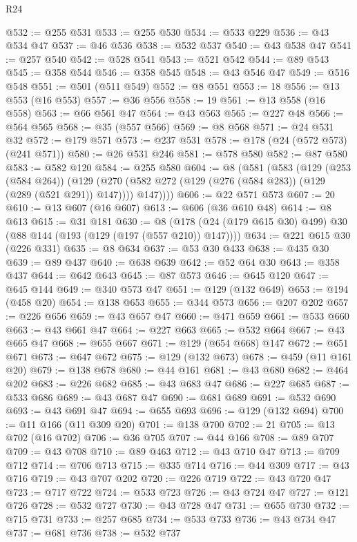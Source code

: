 \begin{lexlean}{R24}
\begin{coremodule}
{{{{{{{{{{{{{{{{{{{{{{{{{{{{{{{{{{{@532 := @255 @531
@533 := @255 @530
@534 := @533 @229
@536 := @43 @534 @47
@537 := @46 @536
@538 := @532 @537
@540 := @43 @538 @47
@541 := @257 @540
@542 := @528 @541
@543 := @521 @542
@544 := @89 @543
@545 := @358 @544
@546 := @358 @545
@548 := @43 @546 @47
@549 := @516 @548
@551 := @501 (@511 @549)
@552 := @8 @551
@553 := 18
@556 := @13 @553 (@16 @553)
@557 := @36 @556
@558 := 19
@561 := @13 @558 (@16 @558)
@563 := @66 @561 @47
@564 := @43 @563
@565 := @227 @48
@566 := @564 @565
@568 := @35 (@557 @566)
@569 := @8 @568
@571 := @24 @531 @32
@572 := @179 @571
@573 := @237 @531
@578 := @178 (@24 (@572 @573) (@241 @571))
@580 := @26 @531 @246
@581 := @578 @580
@582 := @87 @580
@583 := @582 @120
@584 := @255 @580
@604 := @8
    (@581
      (@583
        (@129
          (@253 (@584 @264))
          (@129 (@270 (@582 @272 (@129 (@276 (@584 @283)) (@129 (@289 (@521 @291)) @147)))) @147))))
@606 := @22 @571 @573
@607 := 20
@610 := @13 @607 (@16 @607)
@613 := @606 (@36 @610 @48)
@614 := @8 @613
@615 := @31 @181
@630 := @8 (@178 (@24 (@179 @615 @30) @499) @30 (@88 @144 (@193 (@129 (@197 (@557 @210)) @147))))
@634 := @221 @615 @30 (@226 @331)
@635 := @8 @634
@637 := @53 @30 @433
@638 := @435 @30
@639 := @89 @437
@640 := @638 @639
@642 := @52 @64 @30
@643 := @358 @437
@644 := @642 @643
@645 := @87 @573
@646 := @645 @120
@647 := @645 @144
@649 := @340 @573 @47
@651 := @129 (@132 @649)
@653 := @194 (@458 @20)
@654 := @138 @653
@655 := @344 @573
@656 := @207 @202
@657 := @226 @656
@659 := @43 @657 @47
@660 := @471 @659
@661 := @533 @660
@663 := @43 @661 @47
@664 := @227 @663
@665 := @532 @664
@667 := @43 @665 @47
@668 := @655 @667
@671 := @129 (@654 @668) @147
@672 := @651 @671
@673 := @647 @672
@675 := @129 (@132 @673)
@678 := @459 (@11 @161 @20)
@679 := @138 @678
@680 := @44 @161
@681 := @43 @680
@682 := @464 @202
@683 := @226 @682
@685 := @43 @683 @47
@686 := @227 @685
@687 := @533 @686
@689 := @43 @687 @47
@690 := @681 @689
@691 := @532 @690
@693 := @43 @691 @47
@694 := @655 @693
@696 := @129 (@132 @694)
@700 := @11 @166 (@11 @309 @20)
@701 := @138 @700
@702 := 21
@705 := @13 @702 (@16 @702)
@706 := @36 @705
@707 := @44 @166
@708 := @89 @707
@709 := @43 @708
@710 := @89 @463
@712 := @43 @710 @47
@713 := @709 @712
@714 := @706 @713
@715 := @335 @714
@716 := @44 @309
@717 := @43 @716
@719 := @43 @707 @202
@720 := @226 @719
@722 := @43 @720 @47
@723 := @717 @722
@724 := @533 @723
@726 := @43 @724 @47
@727 := @121 @726
@728 := @532 @727
@730 := @43 @728 @47
@731 := @655 @730
@732 := @715 @731
@733 := @257 @685
@734 := @533 @733
@736 := @43 @734 @47
@737 := @681 @736
@738 := @532 @737
}}}}}}}}}}}}}}}}}}}}}}}}}}}}}}}}}}}
\end{coremodule}
\end{lexlean}
